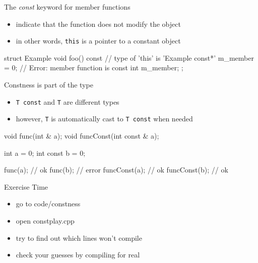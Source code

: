 \begin{frame}[fragile]
  \begin{block}{The {\it const} keyword for member functions}
    \begin{itemize}
    \item indicate that the function does not modify the object
    \item in other words, \texttt{this} is a pointer to a constant object
    \end{itemize}
  \end{block}
  \begin{cppcode}
    struct Example {
      void foo() const  {
        // type of 'this' is 'Example const*'
        m_member = 0; // Error: member function is const
      }
      int m_member;
    };
  \end{cppcode}
\end{frame}

\begin{frame}[fragile]
  \begin{block}{Constness is part of the type}
    \begin{itemize}
    \item \texttt{T const} and \texttt{T} are different types
    \item however, \texttt{T} is automatically cast to \texttt{T const} when needed
    \end{itemize}
  \end{block}
  \begin{cppcode}
    void func(int & a);
    void funcConst(int const & a);

    int a = 0;
    int const b = 0;

    func(a);      // ok
    func(b);      // error
    funcConst(a); // ok
    funcConst(b); // ok
  \end{cppcode}
\end{frame}

\begin{frame}[fragile]
  \begin{alertblock}{Exercise Time}
    \begin{itemize}
    \item go to code/constness
    \item open constplay.cpp
    \item try to find out which lines won't compile
    \item check your guesses by compiling for real
    \end{itemize}
  \end{alertblock}
\end{frame}
